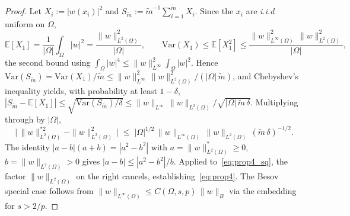 \documentclass[11pt]{article}
\begin{document}
\begin{proof}
Let $X_i := |w(x_i)|^2$ and $S_{\tilde m} := \tilde m^{-1}\sum_{i=1}^{\tilde m} X_i$.
Since the $x_i$ are {\em i.i.d} uniform on $\Omega$,
\[
  \mathbb{E}[X_1]
  = \frac{1}{|\Omega|}\int_\Omega|w|^2
  = \frac{\|w\|^2_{L^2(\Omega)}}{|\Omega|},
  \qquad
  \mathrm{Var}(X_1)
  \le \mathbb{E}[X_1^2]
  \le \frac{\|w\|^2_{L^\infty(\Omega)}\,\|w\|^2_{L^2(\Omega)}}{|\Omega|},
\]
the second bound using
$\int_\Omega|w|^4\le\|w\|^2_{L^\infty}\int_\Omega|w|^2$. Hence
$\mathrm{Var}(S_{\tilde m})=\mathrm{Var}(X_1)/\tilde m\le
\|w\|^2_{L^\infty}\,\|w\|^2_{L^2(\Omega)}/(|\Omega|\,\tilde m)$, and
Chebyshev's inequality yields, with probability at least $1-\delta$,
$|S_{\tilde m}-\mathbb{E}[X_1]|\le
\sqrt{\mathrm{Var}(S_{\tilde m})/\delta}\le
\|w\|_{L^\infty}\,\|w\|_{L^2(\Omega)}/\sqrt{|\Omega|\,\tilde m\,\delta}$.
Multiplying through by $|\Omega|$,
\begin{equation}\label{eq:prop4_sq}
  \bigl|\,\|w\|^{*2}_{L^2(\Omega)} - \|w\|^2_{L^2(\Omega)}\,\bigr|
  \;\le\; |\Omega|^{1/2}\,\|w\|_{L^\infty(\Omega)}\,\|w\|_{L^2(\Omega)}\,
          (\tilde m\,\delta)^{-1/2}.
\end{equation}
The identity $|a-b|(a+b) = |a^2-b^2|$ with
$a = \|w\|^*_{L^2(\Omega)} \ge 0$, $b = \|w\|_{L^2(\Omega)} > 0$ gives
$|a-b| \le |a^2-b^2|/b$. Applied to~\eqref{eq:prop4_sq}, the factor
$\|w\|_{L^2(\Omega)}$ on the right cancels, establishing~\eqref{eq:prop4}.
The Besov special case follows from $\|w\|_{L^\infty(\Omega)} \le
C(\Omega,s,p)\,\|w\|_B$ via the embedding for $s>2/p$.
\end{proof}
\end{document}
